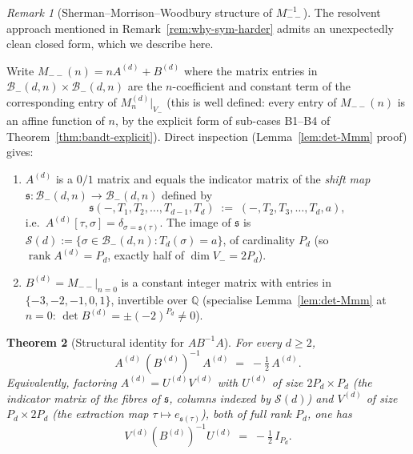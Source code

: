 \documentclass{amsart}
\newtheorem{theorem}{Theorem}[section]
\theoremstyle{definition}
\theoremstyle{remark}
\newtheorem{remark}[theorem]{Remark}
\newcommand{\Q}{\mathbb{Q}}
\DeclareMathOperator{\rank}{rank}
\begin{document}
\begin{remark}[Sherman--Morrison--Woodbury structure of $M_{--}^{-1}$]
\label{rem:smw-structure}
The resolvent approach mentioned in
Remark~\ref{rem:why-sym-harder} admits an unexpectedly
clean closed form, which we describe here.

Write $M_{--}(n) = n A^{(d)} + B^{(d)}$ where the matrix entries
in $\mathcal{B}_-(d, n) \times \mathcal{B}_-(d, n)$ are the
$n$-coefficient and constant term of the corresponding entry of
$M_n^{(d)}\big|_{V_-}$ (this is well defined: every entry of
$M_{--}(n)$ is an affine function of $n$, by the explicit
form of sub-cases B1--B4 of
Theorem~\ref{thm:bandt-explicit}).  Direct inspection
(Lemma~\ref{lem:det-Mmm} proof) gives:
\begin{enumerate}
\item $A^{(d)}$ is a $0/1$ matrix and equals the indicator
matrix of the \emph{shift map}
$\mathfrak{s} : \mathcal{B}_-(d, n) \to \mathcal{B}_-(d, n)$
defined by
\[
  \mathfrak{s}(-, T_1, T_2, \ldots, T_{d-1}, T_d)
  \;:=\; (-, T_2, T_3, \ldots, T_d, a),
\]
i.e.\ $A^{(d)}[\tau, \sigma] = \delta_{\sigma = \mathfrak{s}(\tau)}$.
The image of $\mathfrak{s}$ is
$\mathcal{S}(d) := \{\sigma \in \mathcal{B}_-(d, n) : T_d(\sigma) = a\}$,
of cardinality $P_d$ (so $\rank A^{(d)} = P_d$, exactly half
of $\dim V_- = 2 P_d$).
\item $B^{(d)} = M_{--}|_{n=0}$ is a constant integer matrix
with entries in $\{-3, -2, -1, 0, 1\}$, invertible over $\Q$
(specialise Lemma~\ref{lem:det-Mmm} at $n = 0$:
$\det B^{(d)} = \pm(-2)^{P_d} \neq 0$).
\end{enumerate}
\end{remark}

\begin{theorem}[Structural identity for $A B^{-1} A$]
\label{thm:abinva}
For every $d \ge 2$,
\begin{equation}\label{eq:abinva}
  A^{(d)}\,(B^{(d)})^{-1}\,A^{(d)} \;=\; -\tfrac12\,A^{(d)}.
\end{equation}
Equivalently, factoring $A^{(d)} = U^{(d)} V^{(d)}$ with
$U^{(d)}$ of size $2 P_d \times P_d$ (the indicator matrix of
the fibres of $\mathfrak{s}$, columns indexed by
$\mathcal{S}(d)$) and $V^{(d)}$ of size $P_d \times 2 P_d$
(the extraction map $\tau \mapsto e_{\mathfrak{s}(\tau)}$), both
of full rank $P_d$, one has
\[
  V^{(d)} (B^{(d)})^{-1} U^{(d)} \;=\; -\tfrac12\, I_{P_d}.
\]
\end{theorem}
\end{document}
